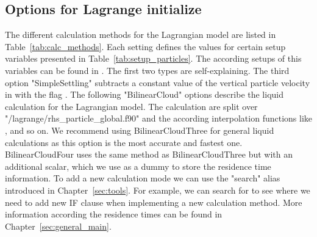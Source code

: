 \documentclass[12pt]{article}
\begin{document}
\subsection{Options for Lagrange initialize}
The different calculation methods for the Lagrangian model are listed in Table~\ref{tab:calc_methods}. Each setting defines the values for certain setup variables presented in Table~\ref{tab:setup_particles}. The according setups of this variables can be found in . The first two types are self-explaining. The third option "SimpleSettling" subtracts a constant value of the vertical particle velocity in  with the flag . The following "BilinearCloud" options describe the liquid calculation for the Lagrangian model. The calculation are split over "/lagrange/rhs\_particle\_global.f90" and the according interpolation functions like ,  and so on. We recommend using BilinearCloudThree for general liquid calculations as this option is the most accurate and fastest one. BilinearCloudFour uses the same method as BilinearCloudThree but with an additional scalar, which we use as a dummy to store the residence time information. To add a new calculation mode we can use the "search" alias introduced in Chapter~\ref{sec:tools}. For example, we can search for  to see where we need to add new IF clause when implementing a new calculation method. More information according the residence times can be found in Chapter~\ref{sec:general_main}. \newline
\begin{table}
\label{tab:type}
    \caption{Options for the Lagrangian calculation method.}
    \label{tab:calc_methods}
\end{table}
\end{document}
